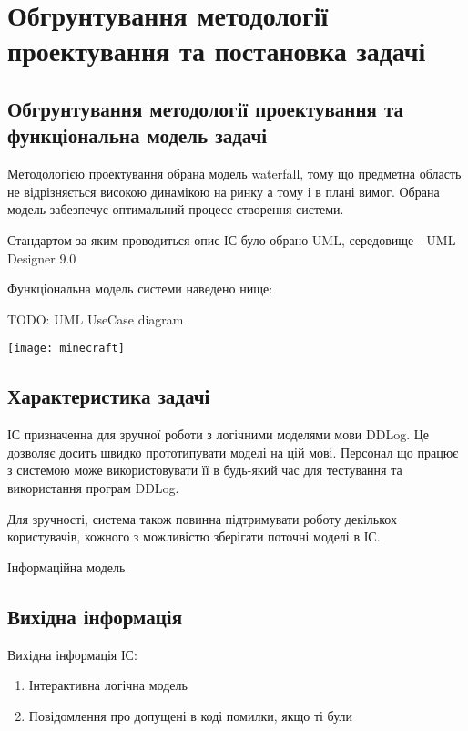 \chapter{Обгрунтування методології проектування та постановка задачі}
\label{chap:second}

\section{Обгрунтування методології проектування та функціональна модель задачі}

Методологією проектування обрана модель waterfall, тому що предметна область не відрізняється високою динамікою на ринку а тому і в плані вимог. Обрана модель забезпечує оптимальний процесс створення системи.

Стандартом за яким проводиться опис ІС було обрано UML, середовище - UML Designer 9.0

Функціональна модель системи наведено нище:

TODO: UML UseCase diagram

\begin{center}

\texttt{[image: minecraft]}

\end{center}

\section{Характеристика задачі}

ІС призначенна для зручної роботи з логічними моделями мови DDLog. Це дозволяє досить швидко прототипувати моделі на цій мові. Персонал що працює з системою може використовувати її в будь-який час для тестування та використання програм DDLog.

Для зручності, система також повинна підтримувати роботу декількох користувачів, кожного з можливістю зберігати поточні моделі в ІС.
 
Інформаційна модель

\section{Вихідна інформація}

Вихідна інформація ІС: 

\begin{enumerate}
	\item Інтерактивна логічна модель
	\item Повідомлення про допущені в коді помилки, якщо ті були
\end{enumerate}

